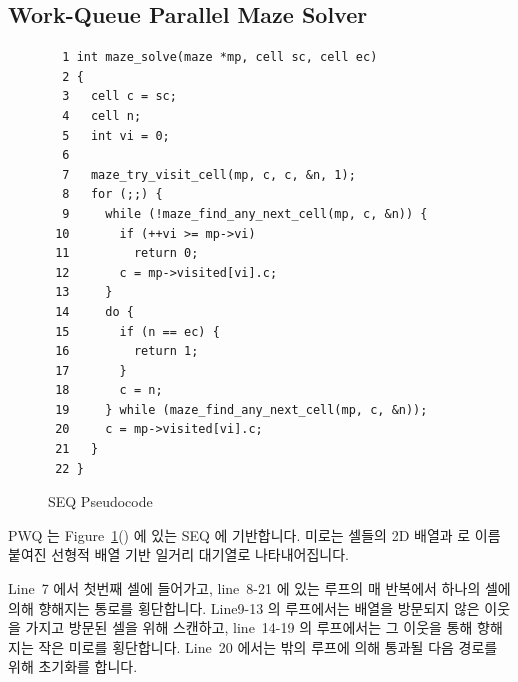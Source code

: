 \subsection{Work-Queue Parallel Maze Solver}
\label{sec:SMPdesign:Work-Queue Parallel Maze Solver}

\begin{figure}[tbp]
{ \scriptsize
\begin{verbatim}
  1 int maze_solve(maze *mp, cell sc, cell ec)
  2 {
  3   cell c = sc;
  4   cell n;
  5   int vi = 0;
  6 
  7   maze_try_visit_cell(mp, c, c, &n, 1);
  8   for (;;) {
  9     while (!maze_find_any_next_cell(mp, c, &n)) {
 10       if (++vi >= mp->vi)
 11         return 0;
 12       c = mp->visited[vi].c;
 13     }
 14     do {
 15       if (n == ec) {
 16         return 1;
 17       }
 18       c = n;
 19     } while (maze_find_any_next_cell(mp, c, &n));
 20     c = mp->visited[vi].c;
 21   }
 22 }
\end{verbatim}
}
\caption{SEQ Pseudocode}
\label{fig:SMPdesign:SEQ Pseudocode}
\end{figure}

PWQ 는 Figure~\ref{fig:SMPdesign:SEQ Pseudocode}() 에 있는 SEQ
에 기반합니다.
미로는 셀들의 2D 배열과  로 이름 붙여진 선형적 배열 기반 일거리
대기열로 나타내어집니다.

Line~7 에서 첫번째 셀에 들어가고, line~8-21 에 있는 루프의 매 반복에서 하나의
셀에 의해 향해지는 통로를 횡단합니다.
Line9-13 의 루프에서는  배열을 방문되지 않은 이웃을 가지고
방문된 셀을 위해 스캔하고, line~14-19 의 루프에서는 그 이웃을 통해 향해지는
작은 미로를 횡단합니다.
Line~20 에서는 밖의 루프에 의해 통과될 다음 경로를 위해 초기화를 합니다.


